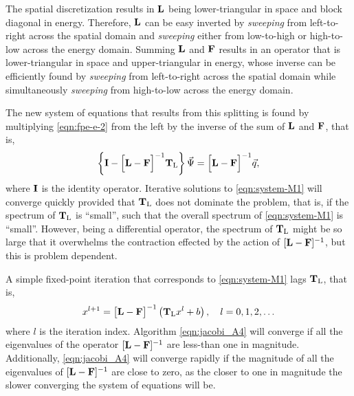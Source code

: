 The \dG spatial discretization results in $\mathbf{L}$ being lower-triangular in space and block diagonal in energy. Therefore, $\mathbf{L}$ can be easy inverted by \emph{sweeping} from left-to-right across the spatial domain and \emph{sweeping} either from low-to-high or high-to-low across the energy domain. Summing $\mathbf{L}$ and $\mathbf{F}$ results in an operator that is lower-triangular in space and upper-triangular in energy, whose inverse can be efficiently found by \emph{sweeping} from left-to-right across the spatial domain while simultaneously \emph{sweeping} from high-to-low across the energy domain. 

The new system of equations that results from this splitting is found by multiplying \ref{eqn:fpe-e-2} from the left by the inverse of the sum of $\mathbf{L}$ and $\mathbf{F}$, that is, 
\begin{equation} 
  \label{eqn:system-M1}
  \left\lbrace \bA{I} - \Big[ \bA{L} - \bA{F} \Big]^{-1} \bA{T}_{\text{L}} \right\rbrace \vec{\Psi}
  = \Big[ \bA{L} - \bA{F} \Big]^{-1} \vec{q},
\end{equation}
where $\mathbf{I}$ is the identity operator. Iterative solutions to \ref{eqn:system-M1} will converge quickly provided that $\mathbf{T}_{\text{L}}$ does not dominate the problem,
that is, if the spectrum of $\mathbf{T}_{\text{L}}$
is ``small'', such that the overall spectrum of \ref{eqn:system-M1} is ``small''. However, being a differential operator, the spectrum of $\mathbf{T}_{\text{L}}$ might be so large that it overwhelms the contraction effected by the action of $[\mathbf{L} - \mathbf{F}]^{-1}$, but this is problem dependent.

A simple fixed-point iteration that corresponds to \ref{eqn:system-M1} lags $\mathbf{T}_{\text{L}}$, that is,
\begin{equation}
  \label{eqn:jacobi_A4}
  x^{l+1} = \big[\bA{L} - \bA{F} \big]^{-1} \left( \bA{T}_{\text{L}} x^{l} + b \right), \quad l=0,1,2,\ldots
\end{equation}
where $l$ is the iteration index. Algorithm \ref{eqn:jacobi_A4} will converge if all the eigenvalues of the operator $[\mathbf{L} - \mathbf{F}]^{-1}$ are less-than one in magnitude. Additionally, \ref{eqn:jacobi_A4} will converge rapidly if the magnitude of all the eigenvalues of $[\mathbf{L} - \mathbf{F}]^{-1}$ are close to zero, as the closer to one in magnitude the slower converging the system of equations will be. 

